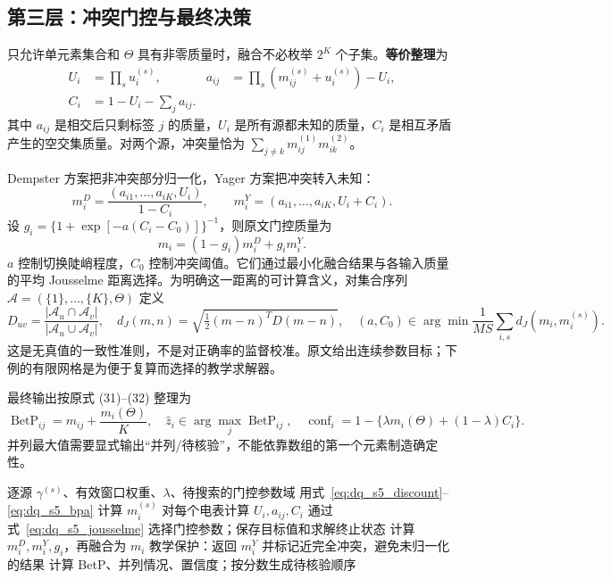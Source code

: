 \documentclass[UTF8,11pt,fontset=fandol,openany,oneside]{ctexbook}
\theoremstyle{definition}
\theoremstyle{remark}
\numberwithin{equation}{chapter}
\begin{document}
\subsection{第三层：冲突门控与最终决策}

只允许单元素集合和 $\Theta$ 具有非零质量时，融合不必枚举 $2^K$ 个子集。\textbf{等价整理}为
\begin{align}
 U_i&=\prod_su_i^{(s)},&
 a_{ij}&=\prod_s(m_{ij}^{(s)}+u_i^{(s)})-U_i,\\
 C_i&=1-U_i-\sum_ja_{ij}.&&
 \label{eq:dq_s5_conjunctive}
\end{align}
其中 $a_{ij}$ 是相交后只剩标签 $j$ 的质量，$U_i$ 是所有源都未知的质量，$C_i$ 是相互矛盾产生的空交集质量。对两个源，冲突量恰为 $\sum_{j\ne k}m_{ij}^{(1)}m_{ik}^{(2)}$。

Dempster 方案把非冲突部分归一化，Yager 方案把冲突转入未知：
\begin{equation}
 m_i^D=\frac{(a_{i1},\ldots,a_{iK},U_i)}{1-C_i},\qquad
 m_i^Y=(a_{i1},\ldots,a_{iK},U_i+C_i).
 \label{eq:dq_s5_dy}
\end{equation}
设 $g_i=\{1+\exp[-a(C_i-C_0)]\}^{-1}$，则原文门控质量为
\begin{equation}
 m_i=(1-g_i)m_i^D+g_im_i^Y.
 \label{eq:dq_s5_gate}
\end{equation}
$a$ 控制切换陡峭程度，$C_0$ 控制冲突阈值。它们通过最小化融合结果与各输入质量的平均 Jousselme 距离选择。为明确这一距离的可计算含义，对集合序列
$\mathcal A=(\{1\},\ldots,\{K\},\Theta)$ 定义
\begin{equation}
 D_{uv}=\frac{|\mathcal A_u\cap\mathcal A_v|}{|\mathcal A_u\cup\mathcal A_v|},\quad
 d_J(m,n)=\sqrt{\tfrac12(m-n)^TD(m-n)},\quad
 (a,C_0)\in\arg\min\frac1{MS}\sum_{i,s}d_J(m_i,m_i^{(s)}).
 \label{eq:dq_s5_jousselme}
\end{equation}
这是无真值的一致性准则，不是对正确率的监督校准。原文给出连续参数目标；下例的有限网格是为便于复算而选择的教学求解器。

最终输出按原式 (31)--(32) 整理为
\begin{equation}
 \operatorname{BetP}_{ij}=m_{ij}+\frac{m_i(\Theta)}K,\quad
 \hat z_i\in\arg\max_j\operatorname{BetP}_{ij},\quad
 \operatorname{conf}_i=1-\{\lambda m_i(\Theta)+(1-\lambda)C_i\}.
 \label{eq:dq_s5_output}
\end{equation}
并列最大值需要显式输出“并列/待核验”，不能依靠数组的第一个元素制造确定性。

\begin{algorithm}[tbp]
\caption{S5 的证据融合：原计算链与可执行边界处理}
\begin{algorithmic}[1]
\Require 逐源 $\gamma^{(s)}$、有效窗口权重、$\lambda$、待搜索的门控参数域
 \State 用式~\eqref{eq:dq_s5_discount}--\eqref{eq:dq_s5_bpa} 计算 $m_i^{(s)}$
\EndFor
\State 对每个电表计算 $U_i,a_{ij},C_i$
\State 通过式~\eqref{eq:dq_s5_jousselme} 选择门控参数；保存目标值和求解终止状态
   \State 计算 $m_i^D,m_i^Y,g_i$，再融合为 $m_i$
 \Else
   \State 教学保护：返回 $m_i^Y$ 并标记近完全冲突，避免未归一化的结果
 \EndIf
 \State 计算 BetP、并列情况、置信度；按分数生成待核验顺序
\EndFor
\end{algorithmic}
\end{algorithm}
\end{document}
